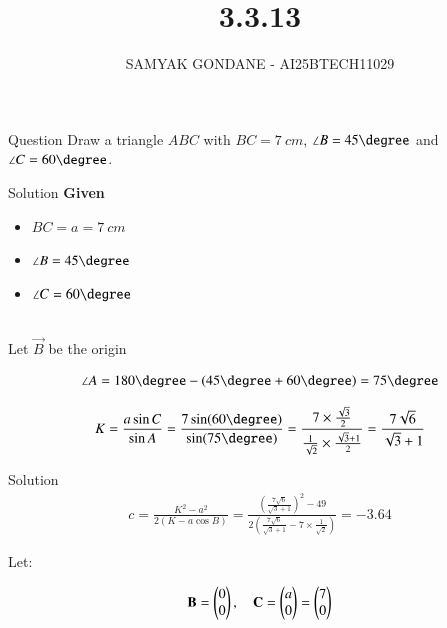 \documentclass{beamer}
\title 
{3.3.13}
\date{}
\author
{SAMYAK GONDANE - AI25BTECH11029}
\begin{document}
\frame{\titlepage}

\begin{frame}{Question}
    Draw a triangle $ABC$ with $BC = 7\ cm$, $\angle B = 45\degree$ and $\angle C = 60\degree$.
\end{frame}

\begin{frame}{Solution}
\textbf{Given}
\begin{itemize}
    \item $BC = a = 7\ cm$
    \item $\angle B = 45\degree$
    \item $\angle C = 60\degree$
\end{itemize}
\\
Let $\vec{B}$ be the origin

\begin{align}
\angle A = 180\degree - (45\degree + 60\degree) = 75\degree
\end{align}

\begin{align}
K = \frac{a \sin C}{\sin A}
= \frac{7 \sin(60\degree)}{\sin (75\degree)}
= \frac{7 \times \frac{\sqrt{3}}{2}}{\frac{1}{\sqrt{2}} \times \frac{\sqrt{3} + 1}{2}}
= \frac{7 \sqrt{6}}{\sqrt{3} + 1}
\end{align}
\end{frame}


\begin{frame}{Solution}
\begin{align}
c = \frac{K^2 - a^2}{2(K - a \cos B)}
= \frac{(\frac{7 \sqrt{6}}{\sqrt{3} + 1})^2 - 49}{2( \frac{7 \sqrt{6}}{\sqrt{3} + 1} - 7 \times \frac{1}{\sqrt{2}})} = -3.64
\end{align}

Let:

\begin{align}
\mathbf{B} = \begin{pmatrix}0 \\ 0\end{pmatrix}, \quad
\mathbf{C} = \begin{pmatrix}a \\ 0\end{pmatrix} = \begin{pmatrix}7 \\ 0\end{pmatrix}
\end{align}
\end{frame}
\end{document}
